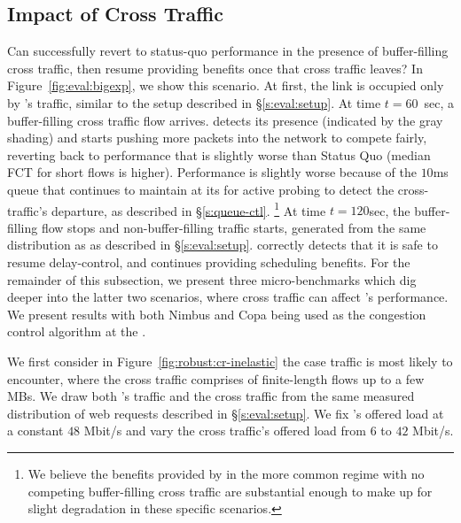 \subsection{Impact of Cross Traffic}\label{s:robust:cross}

Can \name successfully revert to status-quo performance in the presence of buffer-filling cross traffic, then resume providing benefits once that cross traffic leaves?
In Figure~\ref{fig:eval:bigexp}, we show this scenario.
At first, the link is occupied only by \name's traffic, similar to the setup described in \S\ref{s:eval:setup}.
At time $t=60$~sec, a buffer-filling cross traffic flow arrives.
\name detects its presence (indicated by the gray shading) and starts pushing more packets into the network to compete fairly, reverting back to performance that is slightly worse than Status Quo (median FCT for short flows is \bigexpElasticSlowdownWorseness higher). 
Performance is slightly worse because of the $10$ms queue that \name continues to maintain at its \inbox for active probing to detect the cross-traffic's departure, as described in \S\ref{s:queue-ctl}.
\footnote{We believe the benefits provided by \name in the more common regime with no competing buffer-filling cross traffic are substantial enough to make up for slight degradation in these specific scenarios.}
At time $t=120$sec, the buffer-filling flow stops and non-buffer-filling traffic starts, generated from the same distribution as \name as described in \S\ref{s:eval:setup}.
\name correctly detects that it is safe to resume delay-control, and continues providing scheduling benefits.
For the remainder of this subsection, we present three micro-benchmarks which dig deeper into the latter two scenarios, where cross traffic can affect \name's performance. 
We present results with both Nimbus and Copa being used as the congestion control algorithm at the \inbox. 


We first consider in Figure~\ref{fig:robust:cr-inelastic} the case \name traffic is most likely to encounter, where the cross traffic comprises of finite-length flows up to a few MBs.
We draw both \name's traffic and the cross traffic from the same measured distribution of web requests described in \S\ref{s:eval:setup}.
We fix \name's offered load at a constant $48$ Mbit/s and vary the cross traffic's offered load from $6$ to $42$ Mbit/s.

